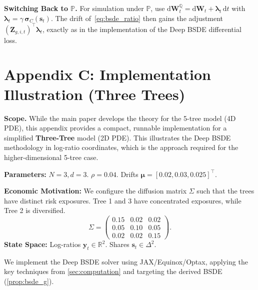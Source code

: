 \documentclass[11pt,letterpaper,oneside]{article}
\numberwithin{equation}{section}
\newcommand{\R}{\mathbb{R}}
\newcommand{\1}{\mathbf{1}}
\newcommand{\diff}{\mathrm{d}}
\begin{document}
\begin{tcolorbox}[didacticstyle]
    	\textbf{Switching Back to $\mathbb{P}$.} For simulation under $\mathbb{P}$, use $\diff\bm{W}_t^{\mathbb{Q}} = \diff\bm{W}_t + \bm{\lambda}_t\,\diff t$ with $\bm{\lambda}_t=\gamma\,\bm{\sigma}_C(\bm{s}_t)$. The drift of~\eqref{eq:bsde_ratio} then gains the adjustment $(\bm{Z}_{g,i,t})^{\top}\bm{\lambda}_t$, exactly as in the implementation of the Deep BSDE differential loss.
\end{tcolorbox}

\section{Appendix C: Implementation Illustration (Three Trees)}\label{sec:addendum_three_trees}

\begin{tcolorbox}[didacticstyle]
    \textbf{Scope.} While the main paper develops the theory for the 5-tree model (4D PDE), this appendix provides a compact, runnable implementation for a simplified \textbf{Three-Tree} model (2D PDE). This illustrates the Deep BSDE methodology in log-ratio coordinates, which is the approach required for the higher-dimensional 5-tree case.

\begin{tcolorbox}[mathstyle,title={Three-Tree Parameters}]
  	\textbf{Parameters:} $N=3, d=3$. $\rho=0.04$.
  Drifts $\bm{\mu} = [0.02, 0.03, 0.025]^{\top}$.
    
  	\textbf{Economic Motivation:} We configure the diffusion matrix $\Sigma$ such that the trees have distinct risk exposures. Tree 1 and 3 have concentrated exposures, while Tree 2 is diversified.
  \[
  \Sigma = \begin{pmatrix}
    0.15 & 0.02 & 0.02 \\
    0.05 & 0.10 & 0.05 \\
    0.02 & 0.02 & 0.15
  \end{pmatrix}.
  \]
  	\textbf{State Space:} Log-ratios $\bm{y}_t \in \R^2$. Shares $\bm{s}_t \in \Delta^2$.

\begin{tcolorbox}[didacticstyle,title={Computational Strategy Applied}]
  We implement the Deep BSDE solver using JAX/Equinox/Optax, applying the key techniques from \cref{sec:computation} and targeting the derived BSDE (\cref{prop:bsde_g}).


\end{tcolorbox}
\end{tcolorbox}
\end{tcolorbox}
\end{document}
